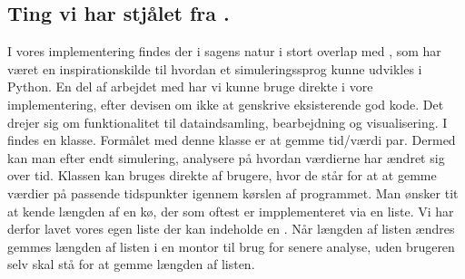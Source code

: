\subsection{Ting vi har stjålet fra \simpy.}
I vores implementering findes der i sagens natur i stort overlap med \simpy, som har været en inspirationskilde til hvordan et simuleringssprog kunne udvikles i Python. En del af arbejdet med \simpy har vi kunne bruge direkte i vore implementering, efter devisen om ikke at genskrive eksisterende god kode. Det drejer sig om funktionalitet til dataindsamling, bearbejdning og visualisering. I \simpy findes en  klasse. Formålet med denne klasse er at gemme tid/værdi par. Dermed kan man efter endt simulering, analysere på hvordan værdierne har ændret sig over tid. Klassen  kan bruges direkte af brugere, hvor de står for at at gemme værdier på passende tidspunkter igennem kørslen af programmet. Man ønsker tit at kende længden af en kø, der som oftest er impplementeret via en liste. Vi har derfor lavet vores egen liste der kan indeholde en . Når længden af listen ændres gemmes længden af listen i en montor til brug for senere analyse, uden brugeren selv skal stå for at gemme længden af listen.


